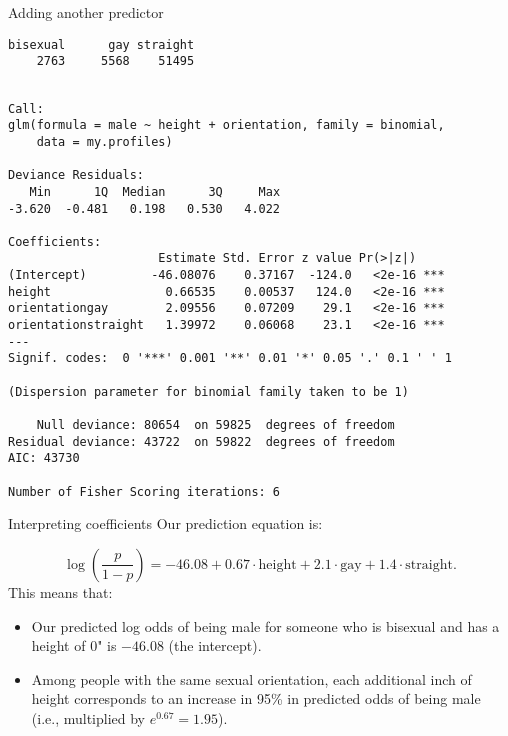 \documentclass{beamer}\usepackage[]{graphicx}\usepackage[]{color}
\makeatletter
\newenvironment{kframe}{%
 \def\at@end@of@kframe{}%
 \ifinner\ifhmode%
  \def\at@end@of@kframe{\end{minipage}}%
  \begin{minipage}{\columnwidth}%
 \fi\fi%
 \def\FrameCommand##1{\hskip\@totalleftmargin \hskip-\fboxsep
 \colorbox{shadecolor}{##1}\hskip-\fboxsep
     \hskip-\linewidth \hskip-\@totalleftmargin \hskip\columnwidth}%
 \MakeFramed {\advance\hsize-\width
   \@totalleftmargin\z@ \linewidth\hsize
   \@setminipage}}%
 {\par\unskip\endMakeFramed%
 \at@end@of@kframe}
\newenvironment{knitrout}{}{} %
\makeatother
\begin{document}
\begin{darkframes}
\begin{frame}[fragile]{Adding another predictor}
\begin{knitrout}
\begin{kframe}
\begin{verbatim}
bisexual      gay straight 
    2763     5568    51495 
\end{verbatim}
\end{kframe}
\end{knitrout}
    \end{frame}

    \begin{frame}[fragile]
      \fontvsm\vspace{-0.3cm}
\begin{knitrout}
\begin{kframe}
\begin{verbatim}

Call:
glm(formula = male ~ height + orientation, family = binomial, 
    data = my.profiles)

Deviance Residuals: 
   Min      1Q  Median      3Q     Max  
-3.620  -0.481   0.198   0.530   4.022  

Coefficients:
                     Estimate Std. Error z value Pr(>|z|)    
(Intercept)         -46.08076    0.37167  -124.0   <2e-16 ***
height                0.66535    0.00537   124.0   <2e-16 ***
orientationgay        2.09556    0.07209    29.1   <2e-16 ***
orientationstraight   1.39972    0.06068    23.1   <2e-16 ***
---
Signif. codes:  0 '***' 0.001 '**' 0.01 '*' 0.05 '.' 0.1 ' ' 1

(Dispersion parameter for binomial family taken to be 1)

    Null deviance: 80654  on 59825  degrees of freedom
Residual deviance: 43722  on 59822  degrees of freedom
AIC: 43730

Number of Fisher Scoring iterations: 6
\end{verbatim}
\end{kframe}
\end{knitrout}
    \end{frame}

    \begin{frame}{Interpreting coefficients}
      Our prediction equation is:
      
      \[
        \log\left(\frac{p}{1-p}\right) =
          -46.08 +
          0.67\cdot\text{height} +
          2.1\cdot\text{gay} +
          1.4\cdot\text{straight}.
      \]
      This means that:
      \begin{itemize}[<+->]
        \item Our predicted log odds of being male for someone who is bisexual and has a height of 0" is $-46.08$ (the intercept).
        \item Among people with the same sexual orientation, each additional inch of height corresponds to an increase in 95\% in predicted odds of being male (i.e., multiplied by $e^{0.67} = 1.95$).
      \end{itemize}
    \end{frame}


\end{darkframes}
\end{document}
